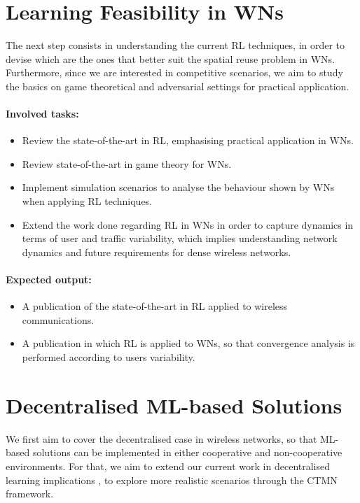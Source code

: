 \documentclass[12pt, a4paper,twoside]{tesi_upf}
\begin{document}
		\section{Learning Feasibility in WNs}
		\label{section:contribution2}
			The next step consists in understanding the current RL techniques, in order to devise which are the ones that better suit the spatial reuse problem in WNs. Furthermore, since we are interested in competitive scenarios, we aim to study the basics on game theoretical and adversarial settings for practical application.			
			\paragraph{Involved tasks:}		
			\begin{itemize}
				\item Review the state-of-the-art in RL, emphasising practical application in WNs.
				\item Review state-of-the-art in game theory for WNs.
				\item Implement simulation scenarios to analyse the behaviour shown by WNs when applying RL techniques.
				\item Extend the work done regarding RL in WNs in order to capture dynamics in terms of user and traffic variability, which implies understanding network dynamics and future requirements for dense wireless networks.	
			\end{itemize}	
			\paragraph{Expected output:}		
			\begin{itemize}
				\item A publication of the state-of-the-art in RL applied to wireless communications.				
				\item A publication in which RL is applied to WNs, so that convergence analysis is performed according to users variability.
			\end{itemize}		
		
		\section{Decentralised ML-based Solutions}
		\label{section:contribution3}	
			We first aim to cover the decentralised case in wireless networks, so that ML-based solutions can be implemented in either cooperative and non-cooperative environments.  For that, we aim to extend our current work in decentralised learning implications \cite{wilhelmi2017implications, wilhelmi2017enhancing}, to explore more realistic scenarios through the CTMN framework. 
				
\end{document}
